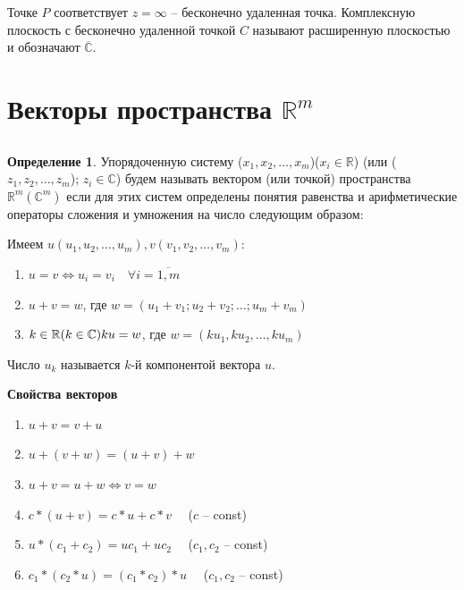 \documentclass[a4paper,oneside]{article}
\theoremstyle{definition}
\newtheorem{definition}{Определение}[subsection]
\theoremstyle{definition}
\theoremstyle{definition}
\begin{document}
Точке $P$ соответствует $z = \infty$ -- бесконечно удаленная точка.
Комплексную плоскость с бесконечно удаленной точкой $C$ называют
расширенную плоскостью и обозначают $\overline{\mathbb{C}}$.

\section{Векторы пространства $\mathbb{R}^m$}

\subsection{}

\begin{definition}
    Упорядоченную систему ($x_1, x_2, \dots, x_m$)($x_i \in \mathbb{R}$)
    (или ($z_1, z_2, \dots, z_m$); $z_i \in \mathbb{C}$) будем называть вектором
    (или точкой) пространства $\mathbb{R}^m (\mathbb{C}^m)$ если для этих
    систем определены понятия равенства и арифметические операторы сложения
    и умножения на число следующим образом:
    
    Имеем $u(u_1, u_2, \dots, u_m), v(v_1, v_2, \dots, v_m)$:
    
    \begin{enumerate}
        \item $u = v \Leftrightarrow u_i = v_i \quad \forall i = \overline{1, m}$
        \item $u + v = w$, где $w = (u_1 + v_1; u_2 + v_2; \dots; u_m + v_m)$
        \item $k \in \mathbb{R} (k \in \mathbb{C}) \\
        ku = w$, где $w = (k u_1, k u_2, \dots, k u_m)$
    \end{enumerate}
    
    Число $u_k$ называется $k$-й компонентой вектора $u$.
\end{definition}

\textbf{Свойства векторов}
\begin{enumerate}
    \item $u + v = v + u$
    \item $u + (v + w) = (u + v) + w$
    \item $u + v = u + w \Leftrightarrow v = w$
    \item $c * (u + v) = c * u + c * v \quad$ ($c$ -- const)
    \item $u * (c_1 + c_2) = u c_1 + u c_2 \quad$ ($c_1, c_2$ -- const)
    \item $c_1 * (c_2 * u) = (c_1 * c_2) * u \quad$ ($c_1, c_2$ -- const)
\end{enumerate}
\end{document}
